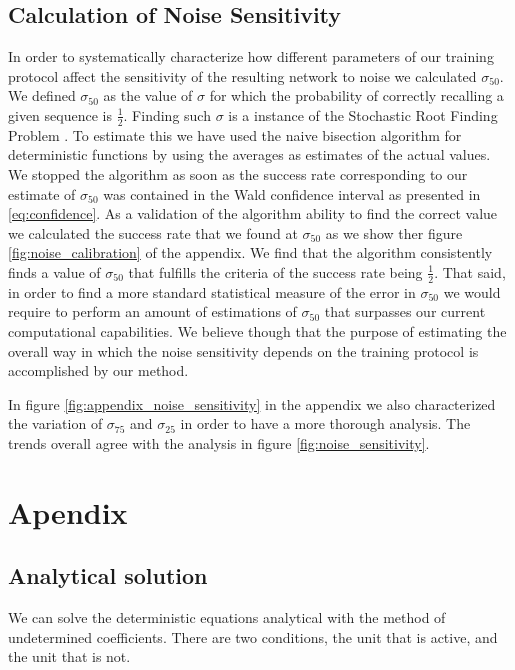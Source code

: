 \documentclass[10pt,a4paper]{article}
\begin{document}
\subsection{Calculation of Noise Sensitivity}
In order to systematically characterize how different parameters of our training protocol affect the sensitivity of the resulting network to noise we calculated $\sigma_{50}$. We defined $\sigma_{50}$ as the  value of $\sigma$ for which the probability of correctly recalling a given sequence is $\frac{1}{2}$. Finding such $\sigma$ is a instance of the Stochastic Root Finding Problem \cite{pasupathy2010choosing}. To estimate this we have used the naive bisection algorithm for deterministic functions by using the averages as estimates of the actual values. We stopped the algorithm as soon as the success rate corresponding to our estimate of $\sigma_{50}$ was contained in the Wald confidence interval as presented in \ref{eq:confidence}. As a validation of the algorithm ability to find the  correct value we calculated the success rate that we found at $\sigma_{50}$ as we show ther figure \ref{fig:noise_calibration} of the appendix. We find that the algorithm consistently finds a value of $\sigma_{50}$ that fulfills the criteria of the success rate being $\frac{1}{2}$. That said, in order to find a more standard statistical measure of the error in $\sigma_{50}$ we would require to perform an amount of estimations of $\sigma_{50}$ that surpasses our current computational capabilities. We believe though that the purpose of estimating the overall way in which the noise sensitivity depends on the training protocol is accomplished by our method. 

In figure \ref{fig:appendix_noise_sensitivity} in the appendix we also characterized the variation of $\sigma_{75}$ and $\sigma_{25}$  in order to have a more thorough analysis. The trends overall agree with the analysis in figure \ref{fig:noise_sensitivity}.  




\section{Apendix}
\subsection{Analytical solution}
We can solve the deterministic equations analytical with the method of undetermined coefficients. There are two conditions, the unit that is active, and the unit that is not. 
\end{document}
